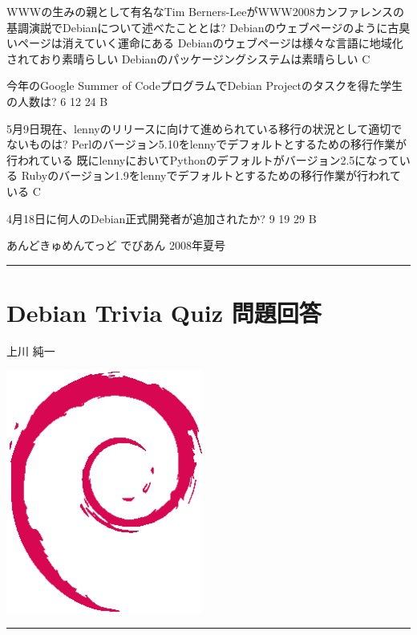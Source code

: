 \documentclass[mingoth,a4paper]{jsarticle}
\renewcommand{\dancersection}[2]{%
\newpage
あんどきゅめんてっど でびあん 2008年夏号
%
\vspace{0.1mm}\\
{\color{dancerlightblue}\rule{\hsize}{2mm}}

%
%
\begin{minipage}[t]{0.6\hsize}
\color{dancerdarkblue}
\vspace{1cm}
\section{#1}
\hfill{}#2\\
\end{minipage}
\begin{minipage}[t]{0.4\hsize}
\vspace{-2cm}
\hfill{}\includegraphics[height=8cm]{image200502/openlogo-nd.eps}\\
\vspace{-5cm}
\end{minipage}
%
%
{\color{dancerdarkblue}\rule{0.74\hsize}{2mm}}
%
\vspace{2cm}
}
\begin{document}
\begin{multicols}{2}
 \santaku
 {WWWの生みの親として有名なTim Berners-LeeがWWW2008カンファレンスの基調演説でDebianについて述べたこととは?}
 {Debianのウェブページのように古臭いページは消えていく運命にある}
 {Debianのウェブページは様々な言語に地域化されており素晴らしい}
 {Debianのパッケージングシステムは素晴らしい}
 {C}
 
 \santaku
 {今年のGoogle Summer of CodeプログラムでDebian Projectのタスクを得た学生の人数は?}
 {6}
 {12}
 {24}
 {B}
 
 \santaku
 {5月9日現在、lennyのリリースに向けて進められている移行の状況として適切でないものは?}
 {Perlのバージョン5.10をlennyでデフォルトとするための移行作業が行われている}
 {既にlennyにおいてPythonのデフォルトがバージョン2.5になっている}
 {Rubyのバージョン1.9をlennyでデフォルトとするための移行作業が行われている}
 {C}
 
 \santaku
 {4月18日に何人のDebian正式開発者が追加されたか?}
 {9}
 {19}
 {29}
 {B}
 
\end{multicols}

\dancersection{Debian Trivia Quiz 問題回答}{上川 純一}
\end{document}
